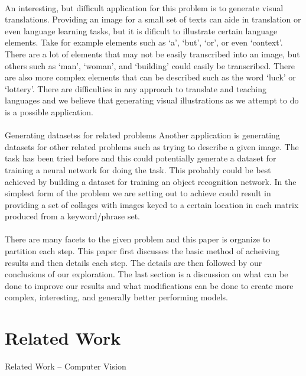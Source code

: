 \documentclass[12pt]{article}
\begin{document}
\paragraph{}
An interesting, but difficult application for this problem is to generate visual translations. 
Providing an image for a small set of texts can aide in translation or even language learning
tasks, but it is dificult to illustrate certain language elements. Take for example elements
such as `a', `but', `or', or even `context'. There are a lot of elements that may not be 
easily transcribed into an image, but others such as `man', `woman', and `building' could
easily be transcribed. There are also more complex elements that can be described such as
the word `luck' or `lottery'. There are difficulties in any approach to translate and 
teaching languages and we believe that generating visual illustrations as we attempt to do 
is a possible application.

\paragraph{}
Generating datasetss for related problems
Another application is generating datasets for other related problems such as trying to 
describe a given image. The task has been tried before and this could potentially generate
a dataset for training a neural network for doing the task. This probably could be best 
achieved by building a dataset for training an object recognition network. In the simplest
form of the problem we are setting out to achieve could result in providing a set of collages
with images keyed to a certain location in each matrix produced from a keyword/phrase set.

\paragraph{}
There are many facets to the given problem and this paper is organize to partition each step. This
paper first discusses the basic method of acheiving results and then details each step. The details
are then followed by our conclusions of our exploration. The last section is a discussion on what 
can be done to improve our results and what modifications can be done to create more complex, 
interesting, and generally better performing models.

\section{Related Work}
Related Work
-- Computer Vision
\end{document}
